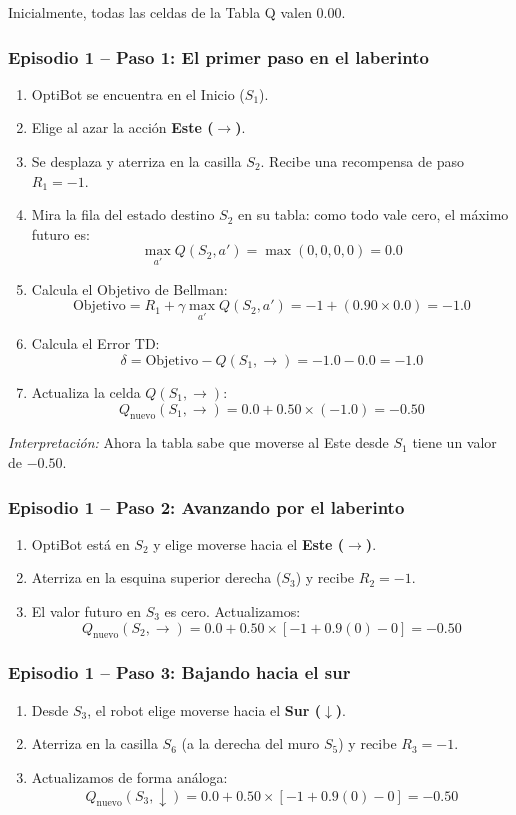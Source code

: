 \begin{calculomanual}
Inicialmente, todas las celdas de la Tabla Q valen $0.00$.

\subsubsection*{Episodio 1 -- Paso 1: El primer paso en el laberinto}
\begin{enumerate}
  \item OptiBot se encuentra en el Inicio ($S_1$).
  \item Elige al azar la acción \textbf{Este ($\rightarrow$)}.
  \item Se desplaza y aterriza en la casilla $S_2$. Recibe una recompensa de paso $R_1 = -1$.
  \item Mira la fila del estado destino $S_2$ en su tabla: como todo vale cero, el máximo futuro es:
  \[
    \max_{a'} Q(S_2, a') = \max(0, 0, 0, 0) = \mathbf{0.0}
  \]
  \item Calcula el Objetivo de Bellman:
  \[
    \text{Objetivo} = R_1 + \gamma \max_{a'} Q(S_2, a') = -1 + (0.90 \times 0.0) = \mathbf{-1.0}
  \]
  \item Calcula el Error TD:
  \[
    \delta = \text{Objetivo} - Q(S_1, \rightarrow) = -1.0 - 0.0 = \mathbf{-1.0}
  \]
  \item Actualiza la celda $Q(S_1, \rightarrow)$:
  \[
    Q_{\text{nuevo}}(S_1, \rightarrow) = 0.0 + 0.50 \times (-1.0) = \mathbf{-0.50}
  \]
\end{enumerate}
\textit{Interpretación:} Ahora la tabla sabe que moverse al Este desde $S_1$ tiene un valor de $-0.50$.

\subsubsection*{Episodio 1 -- Paso 2: Avanzando por el laberinto}
\begin{enumerate}
  \item OptiBot está en $S_2$ y elige moverse hacia el \textbf{Este ($\rightarrow$)}.
  \item Aterriza en la esquina superior derecha ($S_3$) y recibe $R_2 = -1$.
  \item El valor futuro en $S_3$ es cero. Actualizamos:
  \[
    Q_{\text{nuevo}}(S_2, \rightarrow) = 0.0 + 0.50 \times [-1 + 0.9(0) - 0] = \mathbf{-0.50}
  \]
\end{enumerate}

\subsubsection*{Episodio 1 -- Paso 3: Bajando hacia el sur}
\begin{enumerate}
  \item Desde $S_3$, el robot elige moverse hacia el \textbf{Sur ($\downarrow$)}.
  \item Aterriza en la casilla $S_6$ (a la derecha del muro $S_5$) y recibe $R_3 = -1$.
  \item Actualizamos de forma análoga:
  \[
    Q_{\text{nuevo}}(S_3, \downarrow) = 0.0 + 0.50 \times [-1 + 0.9(0) - 0] = \mathbf{-0.50}
  \]
\end{enumerate}


\end{calculomanual}
